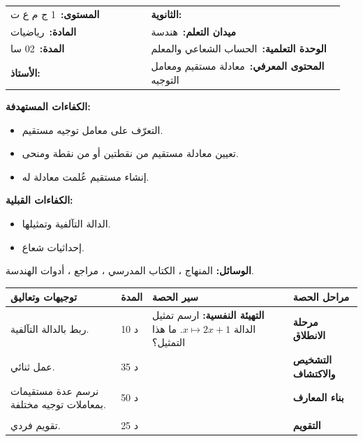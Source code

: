\documentclass[12pt,a4paper]{article}
\makeatletter
\newenvironment{LTR}{\begin{otherlanguage}{english}}{\end{otherlanguage}}
\newcommand{\ar}[1]{\foreignlanguage{arabic}{#1}}
\newcommand{\Phase}[1]{\textbf{#1}}
\newcommand{\Fld}[2]{\textbf{#1:}\ #2}
\newcommand{\ModhHead}[9]{%
\begin{LTR}
\begin{tcolorbox}[enhanced,colback=white,colframe=cThm!85!black,arc=4mm,boxrule=1pt,top=14pt,bottom=6pt,left=8pt,right=8pt,
 overlay={\node[fill=cThm!85!black,text=white,rounded corners=3mm,inner xsep=14pt,inner ysep=4pt,font=\large\bfseries] at ([yshift=0pt]frame.north){\ar{مذكرة رقم #1}};},
 before upper={\selectlanguage{arabic}}]
\begin{tabular}{@{}p{0.4\linewidth}p{0.55\linewidth}@{}}
\Fld{المستوى}{#2} & \Fld{الثانوية}{\dotfill}\\[3pt]
\Fld{المادة}{رياضيات} & \Fld{ميدان التعلم}{#3}\\[3pt]
\Fld{المدة}{#5} & \Fld{الوحدة التعلمية}{#4}\\[3pt]
\Fld{الأستاذ}{\dotfill} & \Fld{المحتوى المعرفي}{#6}\\
\end{tabular}
\end{tcolorbox}
\begin{tcolorbox}[enhanced,colback=white,colframe=cThm!85!black,arc=3mm,boxrule=0.8pt,sidebyside,sidebyside align=top,lefthand ratio=0.5,
 segmentation style={dashed,cThm!60},before upper={\selectlanguage{arabic}},before lower={\selectlanguage{arabic}}]
\textbf{الكفاءات المستهدفة:}\par #8
\tcblower
\textbf{الكفاءات القبلية:}\par #7
\end{tcolorbox}
\end{LTR}
\par\smallskip\textbf{الوسائل:} #9\par\smallskip}
\newenvironment{Sayr}{%
\begin{LTR}\renewcommand{\arraystretch}{1.25}
\begin{longtable}{|p{0.17\textwidth}|>{\centering\arraybackslash}p{0.06\textwidth}|p{0.53\textwidth}|>{\centering\arraybackslash}p{0.12\textwidth}|}
\hline\rowcolor{cThm!12}\ar{\textbf{توجيهات وتعاليق}} & \ar{\textbf{المدة}} & \ar{\textbf{سير الحصة}} & \ar{\textbf{مراحل الحصة}}\\\hline\endhead
\hline\endfoot}{\end{longtable}\end{LTR}}
\newcommand{\Row}[4]{\ar{\small #4} & \ar{#3} & \ar{#2} & \cellcolor{cThm!8}\ar{\Phase{#1}}\\\hline}
\newcommand{\Lab}[2]{\foreignlanguage{english}{\tcbox[on line,colback=#1,colframe=#1,boxrule=0pt,arc=2pt,boxsep=1pt,left=5pt,right=5pt,top=1pt,bottom=1pt]{\ar{\textcolor{white}{\textbf{#2}}}}}}
\newcommand{\Num}[1]{\foreignlanguage{english}{\tikz[baseline=(c.base)]\node[fill=cDef,text=white,inner sep=2pt,font=\footnotesize\bfseries](c){#1};}}
\newcommand{\ck}{\ensuremath{{\color{cRem}\checkmark}}}
\makeatother
\begin{document}
\newpage
\ModhHead{21}{1 ج م ع ت}{هندسة}{الحساب الشعاعي والمعلم}{02 سا}{معادلة مستقيم ومعامل التوجيه}%
{\begin{itemize}\item الدالة التآلفية وتمثيلها.\item إحداثيات شعاع.\end{itemize}}%
{\begin{itemize}\item التعرّف على معامل توجيه مستقيم.\item تعيين معادلة مستقيم من نقطتين أو من نقطة ومنحى.\item إنشاء مستقيم عُلمت معادلة له.\end{itemize}}%
{المنهاج ، الكتاب المدرسي ، مراجع ، أدوات الهندسة.}
\begin{Sayr}
\Row{مرحلة الانطلاق}{%
\textbf{التهيئة النفسية:} ارسم تمثيل الدالة $x\mapsto2x+1$. ما هذا التمثيل؟}{10 د}{ربط بالدالة التآلفية.}
\Row{التشخيص والاكتشاف}{%
\Lab{cEx}{مناقشة نشاط 06 صفحة 253}\par\ck\ النقطة $M(x;y)$ تنتمي إلى المستقيم $(AB)$ إذا وفقط إذا كان $\overrightarrow{AM}$ و $\overrightarrow{AB}$ مرتبطين خطياً: نحصل على علاقة بين $x$ و $y$.\par
\ck\ مثلاً $A(1;2)$ و $B(3;6)$: $(x-1)\times4-(y-2)\times2=0$ أي $y=2x$.\par
}{35 د}{عمل ثنائي.}
\Row{بناء المعارف}{%
\Lab{cThm}{خاصية}\par\ck\ كل مستقيم غير موازٍ لمحور التراتيب له معادلة من الشكل $y=mx+p$ ؛ $m$ \textbf{معامل التوجيه} و $p$ \textbf{الترتيب إلى المبدأ}.\par
\ck\ كل مستقيم موازٍ لمحور التراتيب له معادلة من الشكل $x=c$.\par
\ck\ $m=\dfrac{y_B-y_A}{x_B-x_A}$ ($x_A\ne x_B$).\par
\ck\ مستقيمان متوازيان $\iff$ لهما نفس معامل التوجيه.\par
\Lab{cEx}{مثال}\ المستقيم الذي يشمل $C(0;-1)$ ويوازي $y=2x$: \ $y=2x-1$.\par}{50 د}{نرسم عدة مستقيمات بمعاملات توجيه مختلفة.}
\Row{}{%
\Lab{cMeth}{إنشاء مستقيم}\ نعيّن نقطتين منه (مثلاً $x=0$ و $x=1$) ونصلهما.\par\Lab{cThm!80!black}{حذار}\ المستقيم $x=c$ ليس تمثيلاً لدالة.}{}{}
\Row{التقويم}{%
\Lab{cEx}{تطبيق}\par\Num{1} عيّن معادلة المستقيم الذي يشمل $E(-1;4)$ و $F(2;-2)$. \Num{2} هل $G(3;-4)$ تنتمي إليه؟\par\textbf{الحل:} \Num{1} $m=\dfrac{-2-4}{2+1}=-2$ و $4=2+p$ ، إذن $y=-2x+2$ ؛ \Num{2} $-2\times3+2=-4$: نعم.\par\textbf{واجب منزلي:} تمارين من الكتاب المدرسي.\par\smallskip\textbf{ملاحظات حول سير الحصة:} \dotfill}{25 د}{تقويم فردي.}
\end{Sayr}
\end{document}
